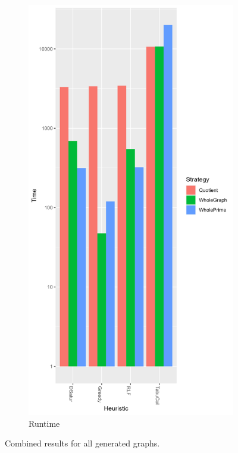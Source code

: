 \documentclass[a4paper]{article}
\begin{document}
\begin{figure}[p]
\begin{subfigure}{\resultbase}
    \end{subfigure}%
    \begin{subfigure}{\resultbase}
        \includegraphics[width=\columnwidth]{Tables/GeneratedTime.png}
      \caption{Runtime}
      \label{fig:generatedt}
    \end{subfigure}
\caption{Combined results for all generated graphs. \figdesc}
\label{fig:generated}
\end{figure}
\end{document}
